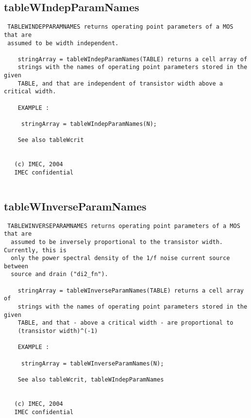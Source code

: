 \newpage
\subsection{tableWIndepParamNames}
\label{sec:tableWIndepParamNames}
\begin{verbatim}
 TABLEWINDEPPARAMNAMES returns operating point parameters of a MOS that are 
 assumed to be width independent. 
 
    stringArray = tableWIndepParamNames(TABLE) returns a cell array of
    strings with the names of operating point parameters stored in the given
    TABLE, and that are independent of transistor width above a critical width.
 
    EXAMPLE :
 
     stringArray = tableWIndepParamNames(N);
 
    See also tableWcrit
 
 
   (c) IMEC, 2004
   IMEC confidential 
 

\end{verbatim}

\newpage
\subsection{tableWInverseParamNames}
\label{sec:tableWInverseParamNames}
\begin{verbatim}
 TABLEWINVERSEPARAMNAMES returns operating point parameters of a MOS that are 
  assumed to be inversely proportional to the transistor width. Currently, this is
  only the power spectral density of the 1/f noise current source between
  source and drain ("di2_fn").
 
    stringArray = tableWInverseParamNames(TABLE) returns a cell array of
    strings with the names of operating point parameters stored in the given
    TABLE, and that - above a critical width - are proportional to 
    (transistor width)^(-1)
 
    EXAMPLE :
 
     stringArray = tableWInverseParamNames(N);
 
    See also tableWcrit, tableWIndepParamNames
 
 
   (c) IMEC, 2004
   IMEC confidential 
 

\end{verbatim}

\newpage
